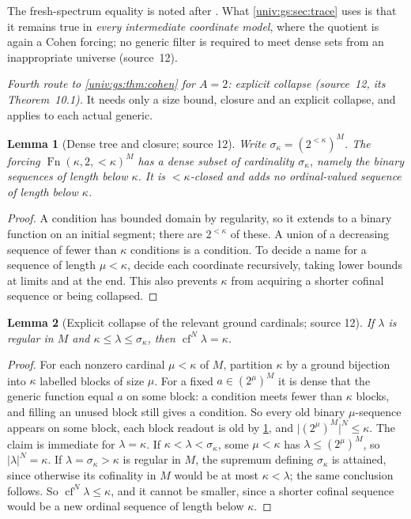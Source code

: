 \documentclass[11pt,letterpaper]{article}
\numberwithin{equation}{section}
\newtheorem{lemma}[lemma]{Lemma}
\theoremstyle{definition}
\theoremstyle{remark}
\newcommand{\cf}{\operatorname{cf}}
\newcommand{\abs}[1]{\lvert#1\rvert}
\newcommand{\Fn}{\operatorname{Fn}}
\begin{document}
The fresh-spectrum equality is noted after \cite[Corollary~2.4]{FKW}. What
\cref{univ:gs:sec:trace} uses is that it remains true in \emph{every intermediate
coordinate model}, where the quotient is again a Cohen forcing; no generic filter is
required to meet dense sets from an inappropriate universe (source~12).

\emph{Fourth route to \cref{univ:gs:thm:cohen} for $A=2$: explicit collapse
(source~12, its Theorem~10.1).} It needs only a size bound, closure and an explicit
collapse, and applies to each actual generic.

\begin{lemma}[Dense tree and closure; source 12]\label{univ:gs:lem:densetree}
Write $\sigma_\kappa=(2^{<\kappa})^M$. The forcing $\Fn(\kappa,2,{<}\kappa)^M$ has a
dense subset of cardinality $\sigma_\kappa$, namely the binary sequences of length
below $\kappa$. It is $<\kappa$-closed and adds no ordinal-valued sequence of length
below $\kappa$.
\end{lemma}
\begin{proof}
A condition has bounded domain by regularity, so it extends to a binary function on
an initial segment; there are $2^{<\kappa}$ of these. A union of a decreasing sequence
of fewer than $\kappa$ conditions is a condition. To decide a name for a sequence of
length $\mu<\kappa$, decide each coordinate recursively, taking lower bounds at limits
and at the end. This also prevents $\kappa$ from acquiring a shorter cofinal sequence
or being collapsed.
\end{proof}

\begin{lemma}[Explicit collapse of the relevant ground cardinals; source 12]\label{univ:gs:lem:collapse}
If $\lambda$ is regular in $M$ and $\kappa\le\lambda\le\sigma_\kappa$, then
$\cf^N\lambda=\kappa$.
\end{lemma}
\begin{proof}
For each nonzero cardinal $\mu<\kappa$ of $M$, partition $\kappa$ by a ground bijection
into $\kappa$ labelled blocks of size $\mu$. For a fixed $a\in(2^\mu)^M$ it is dense
that the generic function equal $a$ on some block: a condition meets fewer than
$\kappa$ blocks, and filling an unused block still gives a condition. So every old
binary $\mu$-sequence appears on some block, each block readout is old by
\cref{univ:gs:lem:densetree}, and $\abs{(2^\mu)^M}^N\le\kappa$. The claim is immediate
for $\lambda=\kappa$. If $\kappa<\lambda<\sigma_\kappa$, some $\mu<\kappa$ has
$\lambda\le(2^\mu)^M$, so $\abs\lambda^N=\kappa$. If $\lambda=\sigma_\kappa>\kappa$ is
regular in $M$, the supremum defining $\sigma_\kappa$ is attained, since otherwise its
cofinality in $M$ would be at most $\kappa<\lambda$; the same conclusion follows. So
$\cf^N\lambda\le\kappa$, and it cannot be smaller, since a shorter cofinal sequence
would be a new ordinal sequence of length below $\kappa$.
\end{proof}
\end{document}
